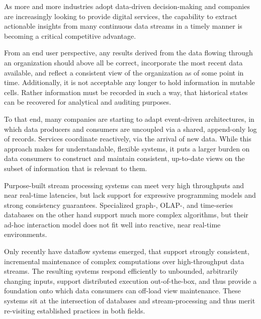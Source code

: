 \documentclass[../index.tex]{subfiles}
\begin{document}
As more and more industries adopt data-driven decision-making and
companies are increasingly looking to provide digital services, the
capability to extract actionable insights from many continuous data
streams in a timely manner is becoming a critical competitive
advantage.

From an end user perspective, any results derived from the data
flowing through an organization should above all be correct,
incorporate the most recent data available, and reflect a consistent
view of the organization as of some point in time. Additionally, it is
not acceptable any longer to hold information in mutable cells. Rather
information must be recorded in such a way, that historical states can
be recovered for analytical and auditing purposes.

To that end, many companies are starting to adapt event-driven
architectures, in which data producers and consumers are uncoupled via
a shared, append-only log of records. Services coordinate reactively,
via the arrival of new data. While this approach makes for
understandable, flexible systems, it puts a larger burden on data
consumers to construct and maintain consistent, up-to-date views on
the subset of information that is relevant to them.

Purpose-built stream processing systems can meet very high throughputs
and near real-time latencies, but lack support for expressive
programming models and strong consistency guarantees. Specialized
graph-, OLAP-, and time-series databases on the other hand support
much more complex algorithms, but their ad-hoc interaction model does
not fit well into reactive, near real-time environments.

Only recently have dataflow systems emerged, that support strongly
consistent, incremental maintenance of complex computations over
high-throughput data streams. The resulting systems respond
efficiently to unbounded, arbitrarily changing inputs, support
distributed execution out-of-the-box, and thus provide a foundation
onto which data consumers can off-load view maintenance. These systems
sit at the intersection of databases and stream-processing and thus
merit re-visiting established practices in both fields.
\end{document}
